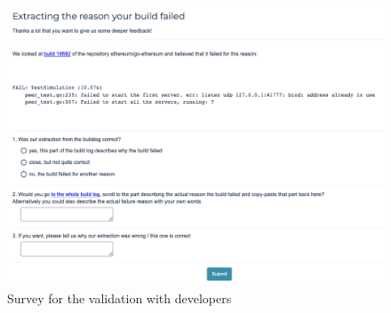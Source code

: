 \documentclass[\myrootdir/main.tex]{subfiles}
\begin{document}
\begin{figure}[h]
	\centering
	\includegraphics[width=\textwidth, clip]{img/dev-survey.png}
	\caption{Survey for the validation with developers}
	\label{fig:dev-survey}
\end{figure}
\end{document}
